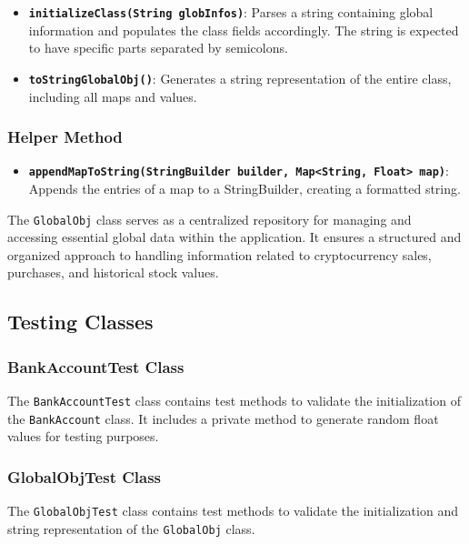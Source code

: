 \documentclass{article}
\begin{document}
\begin{itemize}
    \item \textbf{\texttt{initializeClass(String globInfos)}}: Parses a string containing global information and populates the class fields accordingly. The string is expected to have specific parts separated by semicolons.
    
    \item \textbf{\texttt{toStringGlobalObj()}}: Generates a string representation of the entire class, including all maps and values.
\end{itemize}

\subsubsection{Helper Method}

\begin{itemize}
    \item \textbf{\texttt{appendMapToString(StringBuilder builder, Map<String, Float> map)}}: Appends the entries of a map to a StringBuilder, creating a formatted string.
\end{itemize}

The \texttt{GlobalObj} class serves as a centralized repository for managing and accessing essential global data within the application. It ensures a structured and organized approach to handling information related to cryptocurrency sales, purchases, and historical stock values.

\subsection{Testing Classes}\label{testing}

\subsubsection{BankAccountTest Class}

The \texttt{BankAccountTest} class contains test methods to validate the initialization of the \texttt{BankAccount} class. It includes a private method to generate random float values for testing purposes.

\subsubsection{GlobalObjTest Class}

The \texttt{GlobalObjTest} class contains test methods to validate the initialization and string representation of the \texttt{GlobalObj} class.
\end{document}
